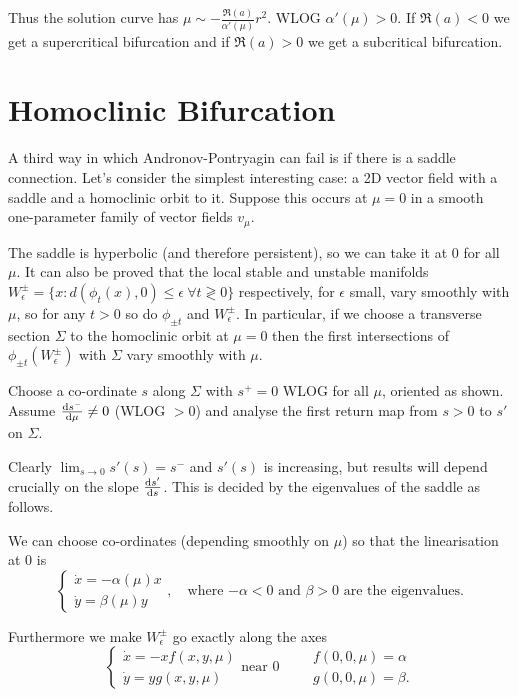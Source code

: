 \documentclass{notes}
\theoremstyle{plain}
\begin{document}
Thus the solution curve has $\mu \sim - \frac{\Re(a)}{\alpha'(\mu)}r^2$.
WLOG $\alpha'(\mu) > 0$.  If $\Re(a) < 0$ we get a supercritical bifurcation
and if $\Re(a) > 0$ we get a subcritical bifurcation.

\vspace{1.5in}

\section{Homoclinic Bifurcation}

A third way in which Andronov-Pontryagin can fail is if there is a saddle
connection.  Let's consider the simplest interesting case: a 2D vector
field with a saddle and a homoclinic orbit to it.  Suppose this occurs at
$\mu=0$ in a smooth one-parameter family of vector fields $v_\mu$.

The saddle is hyperbolic (and therefore persistent), so we can take it
at $0$ for all $\mu$.  It can also be proved that the local stable
and unstable manifolds $W_\epsilon^\pm = \{ x : d(\phi_t(x),0)
\le \epsilon\ \forall t \gtrless 0\}$ respectively, for $\epsilon$ small,
vary smoothly with $\mu$, so for any $t>0$ so do $\phi_{\pm t}$ and
$W_\epsilon^\pm$.  In particular, if we choose a transverse section $\Sigma$
to the homoclinic orbit at $\mu = 0$ then the first intersections of
$\phi_{\pm t}(W_\epsilon^\pm)$ with $\Sigma$ vary smoothly with $\mu$.

\parbox{3in}
{Choose a co-ordinate $s$ along $\Sigma$ with $s^+ = 0$ WLOG for all $\mu$,
oriented as shown.  Assume $\frac{\mathrm{d} s^-}{\mathrm{d}\mu} \neq 0$ (WLOG $>0$)
and analyse the first return map from $s>0$ to $s'$ on $\Sigma$.

Clearly $\lim_{s \to 0} s'(s) = s^-$ and $s'(s)$ is increasing, but
results will depend crucially on the slope $\frac{\mathrm{d} s'}{\mathrm{d} s}$.  This is
decided by the eigenvalues of the saddle as follows.}

We can choose co-ordinates (depending smoothly on $\mu$) so that the
linearisation at $0$ is
\[
\begin{cases}
\dot{x} = - \alpha(\mu) x \\
\dot{y} =  \beta(\mu) y
\end{cases},
\quad \text{where $-\alpha < 0$ and $\beta > 0$ are the eigenvalues.}
\]

Furthermore we make $W_\epsilon^\pm$ go exactly along the axes
\[
\begin{cases}
\dot{x} = -x f(x,y,\mu) \\
\dot{y} =  y g(x,y,\mu)
\end{cases}
\text{near $0$} \qquad
\begin{matrix}
f(0,0,\mu) = \alpha \\
g(0,0,\mu) = \beta.
\end{matrix}
\]
\end{document}
